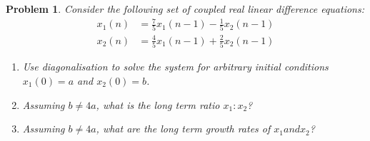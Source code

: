 \documentclass{article}
\newtheorem{problem}{Problem}
\begin{document}
\newpage
\begin{problem}
  Consider the following set of coupled real linear difference equations:
  \begin{align*}
    x_1(n) &= \frac{7}{5}x_1(n - 1) - \frac{1}{5}x_2(n - 1)\\
    x_2(n) &= \frac{4}{5}x_1(n- 1) + \frac{2}{5}x_2(n - 1)
  \end{align*}
  \begin{enumerate}
    \item Use diagonalisation to solve the system for arbitrary initial conditions $ x_1(0) = a$ and $x_2(0) = b$.
    \item Assuming $b \ne 4a$, what is the long term ratio $x_1 : x_2$?
    \item Assuming $b \ne 4a$, what are the long term growth rates of $x_1 and x_2$?
  \end{enumerate}
\end{problem}
\end{document}
